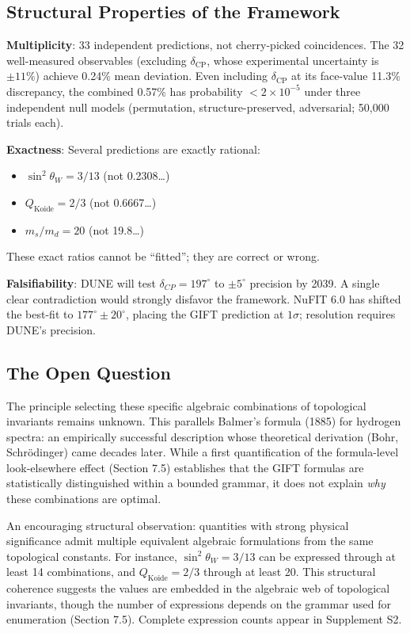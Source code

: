 \documentclass[11pt,a4paper]{article}
\newcommand{\CP}{\mathrm{CP}}
\def\CP{CP}%
\begin{document}
\subsection{Structural Properties of the Framework}

\textbf{Multiplicity}: 33 independent predictions, not cherry-picked coincidences. The 32 well-measured observables (excluding $\delta_{\mathrm{CP}}$, whose experimental uncertainty is $\pm 11\%$) achieve 0.24\% mean deviation. Even including $\delta_{\mathrm{CP}}$ at its face-value 11.3\% discrepancy, the combined 0.57\% has probability $< 2 \times 10^{-5}$ under three independent null models (permutation, structure-preserved, adversarial; 50{,}000 trials each).

\textbf{Exactness}: Several predictions are exactly rational:
\begin{itemize}
\item $\sin^2\theta_W = 3/13$ (not 0.2308\ldots)
\item $Q_{\mathrm{Koide}} = 2/3$ (not 0.6667\ldots)
\item $m_s/m_d = 20$ (not 19.8\ldots)
\end{itemize}

These exact ratios cannot be ``fitted''; they are correct or wrong.

\textbf{Falsifiability}: DUNE will test $\delta_{\CP} = 197^\circ$ to $\pm 5^\circ$ precision by 2039. A single clear contradiction would strongly disfavor the framework. NuFIT 6.0 has shifted the best-fit to $177^\circ \pm 20^\circ$, placing the GIFT prediction at $1\sigma$; resolution requires DUNE's precision.

\subsection{The Open Question}

The principle selecting these specific algebraic combinations of topological invariants remains unknown. This parallels Balmer's formula (1885) for hydrogen spectra: an empirically successful description whose theoretical derivation (Bohr, Schr\"odinger) came decades later. While a first quantification of the formula-level look-elsewhere effect (Section 7.5) establishes that the GIFT formulas are statistically distinguished within a bounded grammar, it does not explain \textit{why} these combinations are optimal.

An encouraging structural observation: quantities with strong physical significance admit multiple equivalent algebraic formulations from the same topological constants. For instance, $\sin^2\theta_W = 3/13$ can be expressed through at least 14 combinations, and $Q_{\mathrm{Koide}} = 2/3$ through at least 20. This structural coherence suggests the values are embedded in the algebraic web of topological invariants, though the number of expressions depends on the grammar used for enumeration (Section 7.5). Complete expression counts appear in Supplement S2.
\end{document}
